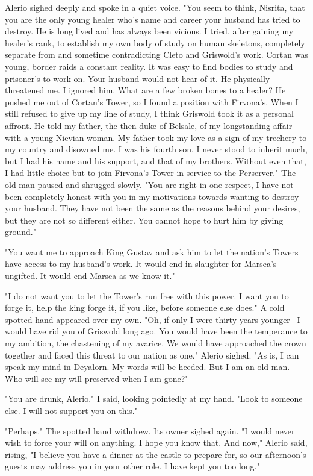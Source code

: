 \documentclass{article}
\begin{document}
Alerio sighed deeply and spoke in a quiet voice. "You seem to think, Nisrita, that you are the only young healer who's name and career your husband has tried to destroy. He is long lived and has always been vicious. I tried, after gaining my healer's rank, to establish my own body of study on human skeletons, completely separate from and sometime contradicting Cleto and Griswold's work. Cortan was young, border raids a constant reality. It was easy to find bodies to study and prisoner's to work on. Your husband would not hear of it. He physically threatened me. I ignored him. What are a few broken bones to a healer? He pushed me out of Cortan's Tower, so I found a position with Firvona's. When I still refused to give up my line of study, I think Griswold took it as a personal affront. He told my father, the then duke of Belsale, of my longstanding affair with a young Nievian woman. My father took my love as a sign of my trechery to my country and disowned me. I was his fourth son. I never stood to inherit much, but I had his name and his support, and that of my brothers. Without even that, I had little choice but to join Firvona's Tower in service to the Perserver." The old man paused and shrugged slowly. "You are right in one respect, I have not been completely honest with you in my motivations towards wanting to destroy your husband. They have not been the same as the reasons behind your desires, but they are not so different either. You cannot hope to hurt him by giving ground."

"You want me to approach King Gustav and ask him to let the nation's Towers have access to my husband's work. It would end in slaughter for Marsea's ungifted. It would end Marsea as we know it."

"I do not want you to let the Tower's run free with this power. I want you to forge it, help the king forge it, if you like, before someone else does." A cold spotted hand appeared over my own. "Oh, if only I were thirty years younger-- I would have rid you of Griswold long ago. You would have been the temperance to my ambition, the chastening of my avarice. We would have approached the crown together and faced this threat to our nation as one." Alerio sighed. "As is, I can speak my mind in Deyalorn. My words will be heeded. But I am an old man. Who will see my will preserved when I am gone?"

"You are drunk, Alerio." I said, looking pointedly at my hand. "Look to someone else. I will not support you on this."

"Perhaps." The spotted hand withdrew. Its owner sighed again. "I would never wish to force your will on anything. I hope you know that. And now," Alerio said, rising, "I believe you have a dinner at the castle to prepare for, so our afternoon's guests may address you in your other role. I have kept you too long."
\end{document}
